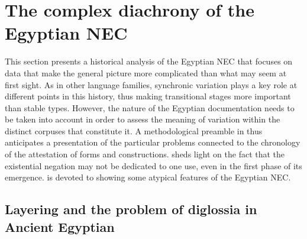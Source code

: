 \documentclass[output=paper,draft,draftmode,colorlinks,citecolor=brown]{langscibook}
\begin{document}
\section{The complex diachrony of the Egyptian NEC}\label{s:AE3}

This section presents a historical analysis of the Egyptian NEC that focuses on data that make the general picture more complicated than what may seem at first sight. As in other language families, synchronic variation plays a key role at different points in this history, thus making transitional stages more important than stable types. However, the nature of the Egyptian documentation needs to be taken into account in order to assess the meaning of variation within the distinct corpuses that constitute it. A methodological preamble in  thus anticipates a presentation of the particular problems connected to the chronology of the attestation of forms and constructions.  sheds light on the fact that the existential negation may not be dedicated to one use, even in the first phase of its emergence.  is devoted to showing some atypical features of the Egyptian NEC.

\subsection{Layering and the problem of diglossia in Ancient Egyptian}\label{s:AE3-1}
\end{document}
